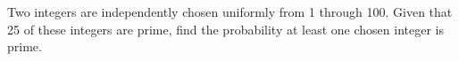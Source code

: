 Two integers are independently chosen uniformly from 1 through 100. Given that 25 of these integers are prime, find the probability at least one chosen integer is prime.
